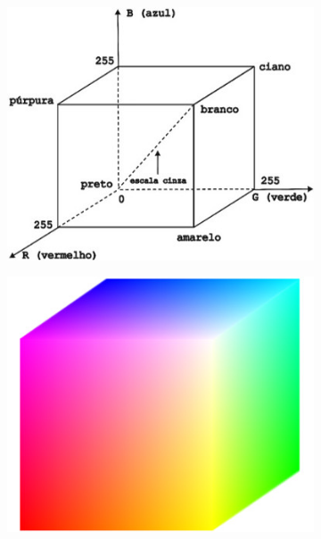 \begin{figure}[htb]
\begin{center}
  \caption{(a) Esquema do cubo de cores RGB (b) Cubo de cores do RGB.}
  \begin{subfigure}[b]{0.4\textwidth}
  \centering
      \includegraphics[scale=0.4]{images/rgb-cube.jpg}
    \caption{}
    \label{rgb-cube}
  \end{subfigure}
  \begin{subfigure}[b]{0.4\textwidth}
  \centering
    \includegraphics[scale=0.4]{images/rgb-color-cube.jpg}
    \caption{}
    \label{rgb-cube-full}
  \end{subfigure}
  
\end{center}

\end{figure}

